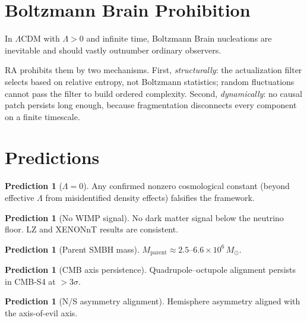 \documentclass[11pt,a4paper]{article}
\theoremstyle{plain}
\theoremstyle{definition}
\newtheorem{prediction}[theorem]{Prediction}
\theoremstyle{remark}
\begin{document}
\section{Boltzmann Brain Prohibition}\label{sec:bb}

In $\Lambda$CDM with $\Lambda > 0$ and infinite time, Boltzmann Brain nucleations
are inevitable and should vastly outnumber ordinary observers.

RA prohibits them by two mechanisms.  First, \emph{structurally}: the actualization
filter selects based on relative entropy, not Boltzmann statistics; random
fluctuations cannot pass the filter to build ordered complexity.  Second,
\emph{dynamically}: no causal patch persists long enough, because fragmentation
disconnects every component on a finite timescale.

\section{Predictions}\label{sec:predictions}

\begin{prediction}[$\Lambda = 0$]\label{pred:lambda}
Any confirmed nonzero cosmological constant (beyond effective $\Lambda$ from
misidentified density effects) falsifies the framework.
\end{prediction}

\begin{prediction}[No WIMP signal]\label{pred:wimp}
No dark matter signal below the neutrino floor.  LZ and XENONnT results are
consistent.
\end{prediction}

\begin{prediction}[Parent SMBH mass]\label{pred:parent}
$M_{\mathrm{parent}} \approx 2.5$--$6.6 \times 10^6\,M_\odot$.
\end{prediction}

\begin{prediction}[CMB axis persistence]\label{pred:axis}
Quadrupole--octupole alignment persists in CMB-S4 at $> 3\sigma$.
\end{prediction}

\begin{prediction}[N/S asymmetry alignment]\label{pred:ns}
Hemisphere asymmetry aligned with the axis-of-evil axis.
\end{prediction}
\end{document}
